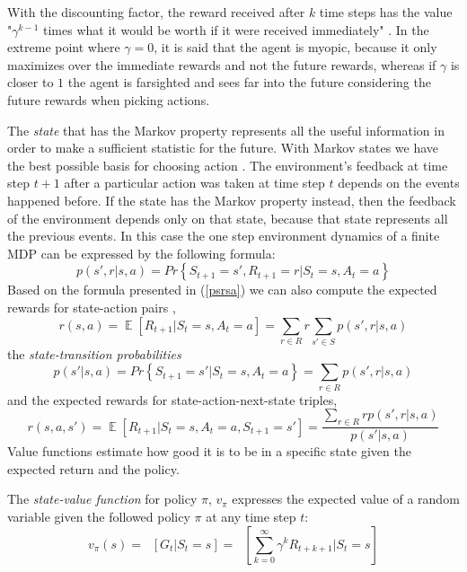 With the discounting factor, the reward received after $k$ time steps has the value "$\gamma ^{k-1}$ times what it would be worth if it were received immediately" \cite{Sutton}. In the extreme point where $\gamma=0$, it is said that the agent is myopic, because it only maximizes over the immediate rewards and not the future rewards, whereas if $\gamma$ is closer to $1$ the agent is farsighted and sees far into the future considering the future rewards when picking actions.

The \textit{state} that has the Markov property represents all the useful information in order to make a sufficient statistic for the future. With Markov states we have the best possible basis for choosing action \cite{Sutton}. The environment's feedback at time step $t+1$ after a particular action was taken at time step $t$ depends on the events happened before. If the state has the Markov property instead, then the feedback of the environment depends only on that state, because that state represents all the previous events. In this case the one step environment dynamics of a finite MDP can be expressed by the following formula:
\begin{equation}\label{psrsa}
p(s',r|s,a)=Pr\left \{ S_{t+1}=s',R_{t+1}=r|S_{t}=s,A_{t}=a \right \}
\end{equation}
Based on the formula presented in (\ref{psrsa}) we can also compute the expected rewards for state-action pairs \cite{Sutton},
\begin{equation}
r(s,a)=\mathop{{}\mathbb{E}}\left [ R_{t+1}|S_{t}=s,A_{t}=a \right ]=\sum_{r\in R}r\sum_{s'\in S}p(s',r|s,a)
\end{equation}
the \textit{state-transition probabilities}
\begin{equation}
p(s'|s,a)=Pr\left \{ S_{t+1}=s'|S_{t}=s,A_{t}=a \right \}=\sum_{r\in R}p(s',r|s,a)
\end{equation}
and the expected rewards for state-action-next-state triples,
\begin{equation}
r(s,a,s')=\mathop{{}\mathbb{E}}\left [ R_{t+1}|S_{t}=s,A_{t}=a,S_{t+1}=s' \right ]=
\frac{\sum_{r\in R}rp(s',r|s,a)}{p(s'|s,a)}
\end{equation}
Value functions estimate how good it is to be in a specific state given the expected return and the policy.

The \textit{state-value function} for policy $\pi$, $v_{\pi }$ expresses the expected value of a random variable given the followed policy $\pi$ at any time step $t$:
\begin{equation}
v_{\pi }(s)=\mathop{{}\mathbb{E}_{\pi}}\left [G_{t}|S_{t}=s \right ]=\mathop{{}\mathbb{E}_{\pi}}\left [ \sum_{k=0}^{\infty}\gamma ^kR_{t+k+1} |S_{t}=s\right ]
\end{equation}

